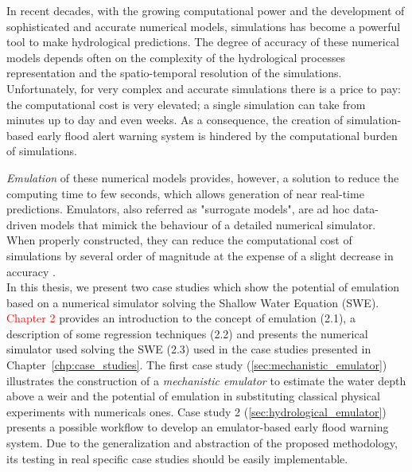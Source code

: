 In recent decades, with the growing computational power and the development of sophisticated and accurate numerical models, simulations has become a powerful tool to make hydrological predictions. 
The degree of accuracy of these numerical models depends often on the complexity of the hydrological processes representation and the spatio-temporal resolution of the simulations. Unfortunately, for very complex and accurate simulations there is a price to pay: the computational cost is very elevated; a single simulation can take from  minutes up to day and even weeks. As a consequence, the creation of simulation-based early flood alert warning system is hindered by the computational burden of simulations. 

\emph{Emulation} of these numerical models provides, however, a solution to reduce the computing time to few seconds, which allows generation of near real-time predictions.
Emulators, also referred as "surrogate models", are ad hoc data-driven models that 
mimick the behaviour of a detailed numerical simulator. When properly constructed, they can reduce the computational cost of simulations by several order of magnitude at the expense of a slight decrease in accuracy \autocite{carbajal_appraisal_2016}.\\

In this thesis, we present two case studies which show the potential of emulation based on a numerical simulator solving the Shallow Water Equation (SWE). 
\textcolor{red}{Chapter 2} provides an introduction to the concept of emulation (2.1), a description of some regression techniques (2.2) and presents the numerical simulator used solving the SWE (2.3) used in the case studies presented in Chapter~\ref{chp:case_studies}.
The first case study (\ref{sec:mechanistic_emulator}) illustrates the construction of a \emph{mechanistic emulator} to estimate the water depth above a weir and the potential of emulation in substituting classical physical experiments with numericals ones.
Case study 2 (\ref{sec:hydrological_emulator}) presents a possible workflow to develop an emulator-based early flood warning system. 
Due to the generalization and abstraction of the proposed methodology, its testing in real specific case studies should be easily implementable.\\



